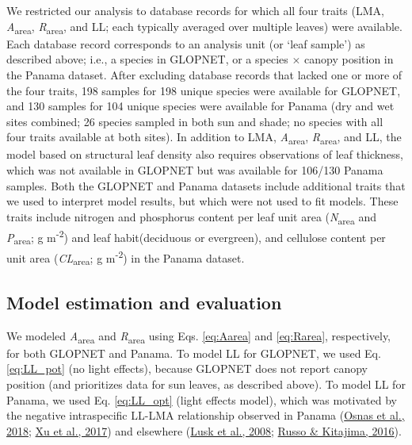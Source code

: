 \documentclass[
  12pt,
  a4paper,
,tablecaptionabove
]{scrartcl}
\begin{document}
We restricted our analysis to database records for which all four traits
(LMA, \emph{A}\textsubscript{area}, \emph{R}\textsubscript{area}, and
LL; each typically averaged over multiple leaves) were available. Each
database record corresponds to an analysis unit (or `leaf sample') as
described above; i.e., a species in GLOPNET, or a species \(\times\)
canopy position in the Panama dataset. After excluding database records
that lacked one or more of the four traits, 198 samples for 198 unique
species were available for GLOPNET, and 130 samples for 104 unique
species were available for Panama (dry and wet sites combined; 26
species sampled in both sun and shade; no species with all four traits
available at both sites). In addition to LMA,
\emph{A}\textsubscript{area}, \emph{R}\textsubscript{area}, and LL, the
model based on structural leaf density also requires observations of
leaf thickness, which was not available in GLOPNET but was available for
106/130 Panama samples. Both the GLOPNET and Panama datasets include
additional traits that we used to interpret model results, but which
were not used to fit models. These traits include nitrogen and
phosphorus content per leaf unit area (\emph{N}\textsubscript{area} and
\emph{P}\textsubscript{area}; g m\textsuperscript{-2}) and leaf
habit(deciduous or evergreen), and cellulose content per unit area
(\emph{CL}\textsubscript{area}; g m\textsuperscript{-2}) in the Panama
dataset.

\hypertarget{model-estimation-and-evaluation}{%
\subsection{Model estimation and
evaluation}\label{model-estimation-and-evaluation}}

We modeled \emph{A}\textsubscript{area} and \emph{R}\textsubscript{area}
using Eqs. \ref{eq:Aarea} and \ref{eq:Rarea}, respectively, for both
GLOPNET and Panama. To model LL for GLOPNET, we used Eq. \ref{eq:LL_pot}
(no light effects), because GLOPNET does not report canopy position (and
prioritizes data for sun leaves, as described above). To model LL for
Panama, we used Eq. \ref{eq:LL_opt} (light effects model), which was
motivated by the negative intraspecific LL-LMA relationship observed in
Panama (\protect\hyperlink{ref-Osnas2018}{Osnas et al., 2018};
\protect\hyperlink{ref-Xu2017}{Xu et al., 2017}) and elsewhere
(\protect\hyperlink{ref-Lusk2008}{Lusk et al., 2008};
\protect\hyperlink{ref-Russo2016}{Russo \& Kitajima, 2016}).
\end{document}
